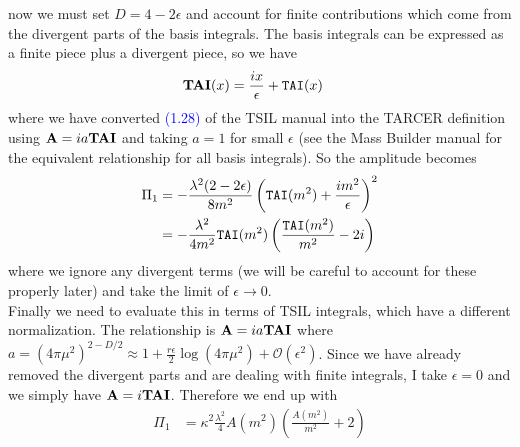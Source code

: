 \documentclass[11pt]{article}
\newcommand{\mb}{\textsf{Mass Builder} \! }
\begin{document}
now we must set $D=4-2\epsilon$ and account for finite contributions which come from the divergent parts of the basis integrals.  The basis integrals can be expressed as a finite piece plus a divergent piece, so we have
\begin{align}
{\tt{\mathbf{TAI}}}(x) &= \frac{ix}{\epsilon} +  {\tt{TAI}}(x)
\end{align}
where we have converted \textcolor{blue}{(1.28)} of the TSIL manual into the TARCER definition using $\mathbf{A}= ia \tt{\mathbf{TAI}}$ and taking $a=1$ for small $\epsilon$ (see the \mb manual for the equivalent relationship for all basis integrals).  So the amplitude becomes
\begin{align*}
\Pi_1 &=- \frac{\lambda^2(2-2\epsilon)}{8 m^2 }       \left( {\tt{TAI}}(m^2) +\frac{im^2}{\epsilon}\right)^2  \\
&=- \frac{\lambda^2}{4 m^2 }  {\tt{TAI}}(m^2) \left( \frac{ {\tt{TAI}}(m^2) } {m^2} - 2i\right)
\end{align*}
where we ignore any divergent terms (we will be careful to account for these properly later) and take the limit of $\epsilon\rightarrow 0$.\\

Finally we need to evaluate this in terms of TSIL integrals, which have a different normalization.  The relationship is $\mathbf{A}= ia \tt{\mathbf{TAI}}$ where $a = (4\pi\mu^2)^{2-D/2} \approx 1 +\frac{r\epsilon}{2}\log(4\pi\mu^2)+\mathcal{O}(\epsilon^2)$.  Since we have already removed the divergent parts and are dealing with finite integrals, I take $\epsilon =  0$ and we simply have $\mathbf{A}= i \tt{\mathbf{TAI}}$.  Therefore we end up with
\begin{align}
\Pi_1 & = \kappa^2  \frac{\lambda^2}{4 } A(m^2) \left( \frac{A(m^2)}{m^2} + 2 \right)
\end{align}
\end{document}
